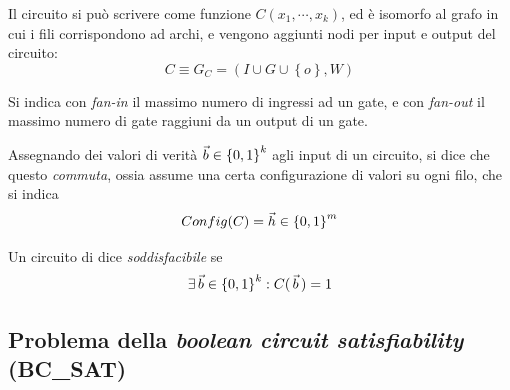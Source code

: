 
Il circuito si può scrivere come funzione $C \left( x_1, \cdots, x_k \right)$, ed è isomorfo al grafo in cui i fili corrispondono ad archi, e vengono aggiunti nodi per input e output del circuito:
\begin{equation*}
    C \equiv G_C = \left( I \cup G \cup \left\{ o \right\}, W \right)
\end{equation*}


Si indica con \emph{fan-in} il massimo numero di ingressi ad un gate, e con \emph{fan-out} il massimo numero di gate raggiuni da un output di un gate.

Assegnando dei valori di verità $\vec{b} \in \left\{0,1\right\}^{k}$ agli input di un circuito, si dice che questo \emph{commuta}, ossia assume una certa configurazione di valori su ogni filo, che si indica
\begin{equation*}
    Config(C) = \vec{h} \in \left\{0,1\right\}^{m}
\end{equation*}

Un circuito di dice \emph{soddisfacibile} se
\begin{equation*}
    \exists \,\vec{b} \in \left\{0,1\right\}^{k} : C ( \, \vec{b} \,) = 1
\end{equation*}

\subsection{Problema della \emph{boolean circuit satisfiability} (BC\_SAT)}


